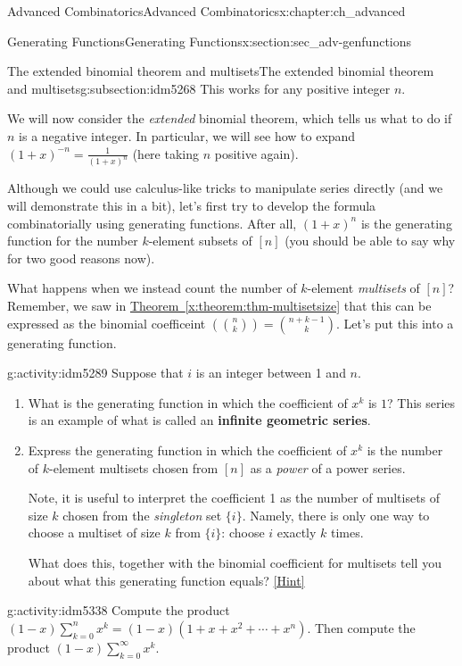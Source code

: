 \documentclass[oneside,10pt,]{book}
\newcommand{\terminology}[1]{\textbf{#1}}
\numberwithin{equation}{chapter}
\newcommand{\mchoose}[2]{\left(\!\binom{#1}{#2}\!\right)}
\begin{document}
\begin{chapterptx}{Advanced Combinatorics}{}{Advanced Combinatorics}{}{}{x:chapter:ch_advanced}
\begin{sectionptx}{Generating Functions}{}{Generating Functions}{}{}{x:section:sec_adv-genfunctions}
\begin{subsectionptx}{The extended binomial theorem and multisets}{}{The extended binomial theorem and multisets}{}{}{g:subsection:idm5268}
This works for any positive integer \(n\).%
\par
We will now consider the \emph{extended} binomial theorem, which tells us what to do if \(n\) is a negative integer.  In particular, we will see how to expand \((1+x)^{-n} = \frac{1}{(1+x)^n}\) (here taking \(n\) positive again).%
\par
Although we could use calculus-like tricks to manipulate series directly (and we will demonstrate this in a bit), let's first try to develop the formula combinatorially using generating functions.  After all, \((1+x)^n\) is the generating function for the number \(k\)-element subsets of \([n]\) (you should be able to say why for two good reasons now).%
\par
What happens when we instead count the number of \(k\)-element \emph{multisets} of \([n]\)?  Remember, we saw in \hyperref[x:theorem:thm-multisetsize]{Theorem~\ref{x:theorem:thm-multisetsize}} that this can be expressed as the binomial coefficeint \(\mchoose{n}{k} = \binom{n+k-1}{k}\).  Let's put this into a generating function.%
\begin{activity}{}{g:activity:idm5289}%
Suppose that \(i\) is an integer between 1 and \(n\).%
\begin{enumerate}[font=\bfseries,label=(\alph*),ref=\alph*]
\item{}What is the generating function in which the coefficient of \(x^k\) is \(1\)? This series is an example of what is called an \terminology{infinite geometric series}.%
\item{}Express the generating function in which the coefficient of \(x^k\) is the number of \(k\)-element multisets chosen from \([n]\) as a \emph{power} of a power series.%
\par
Note, it is useful to interpret the coefficient 1 as the number of multisets of size \(k\) chosen from the \emph{singleton} set \(\{i\}\). Namely, there is only one way to choose a multiset of size \(k\) from \(\{i\}\): choose \(i\) exactly \(k\) times.%
\par
What does this, together with the binomial coefficient for multisets tell you about what this generating function equals?%
\space\hspace*{0pt}\hfill{\tiny\hyperlink{g:hint:idm5324-back}{[Hint]}}\end{enumerate}
\end{activity}
\begin{activity}{}{g:activity:idm5338}%
Compute the product \((1-x)\sum_{k=0}^n x^k = (1-x)(1+x+x^2+\cdots+x^n)\).  Then compute the product \((1-x)\sum_{k=0}^\infty x^k\).%

\end{activity}
\end{subsectionptx}
\end{sectionptx}
\end{chapterptx}
\end{document}
